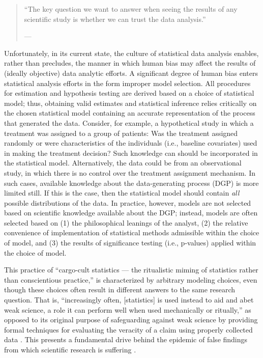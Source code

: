 \documentclass[
  12pt, krantz2,
]{krantz}
\theoremstyle{definition}
\theoremstyle{definition}
\theoremstyle{definition}
\newcommand{\1}{\mathbbm{1}}
\begin{document}
\begin{quote}
``The key question we want to answer when seeing the results of any scientific
study is whether we can trust the data analysis.''

--- \citet{peng2015reproducibility}
\end{quote}

Unfortunately, in its current state, the culture of statistical data analysis
enables, rather than precludes, the manner in which human bias may affect the
results of (ideally objective) data analytic efforts. A significant degree of
human bias enters statistical analysis efforts in the form improper model
selection. All procedures for estimation and hypothesis testing are derived
based on a choice of statistical model; thus, obtaining valid estimates and
statistical inference relies critically on the chosen statistical model
containing an accurate representation of the process that generated the data.
Consider, for example, a hypothetical study in which a treatment was assigned to
a group of patients: Was the treatment assigned randomly or were characteristics
of the individuals (i.e., baseline covariates) used in making the treatment
decision? Such knowledge can should be incorporated in the statistical model.
Alternatively, the data could be from an observational study, in which there is
no control over the treatment assignment mechanism. In such cases, available
knowledge about the data-generating process (DGP) is more limited still. If
this is the case, then the statistical model should contain \emph{all} possible
distributions of the data. In practice, however, models are not selected based
on scientific knowledge available about the DGP; instead, models are often
selected based on (1) the philosophical leanings of the analyst, (2) the
relative convenience of implementation of statistical methods admissible within
the choice of model, and (3) the results of significance testing (i.e.,
p-values) applied within the choice of model.

This practice of ``cargo-cult statistics --- the ritualistic miming of statistics
rather than conscientious practice,'' \citep{stark2018cargo} is characterized by
arbitrary modeling choices, even though these choices often result in different
answers to the same research question. That is, ``increasingly often,
{[}statistics{]} is used instead to aid and abet weak science, a role it can perform
well when used mechanically or ritually,'' as opposed to its original purpose of
safeguarding against weak science by providing formal techniques for evaluating
the veracity of a claim using properly collected data \citep{stark2018cargo}. This
presents a fundamental drive behind the epidemic of false findings from which
scientific research is suffering \citep{vdl2014entering}.
\end{document}
